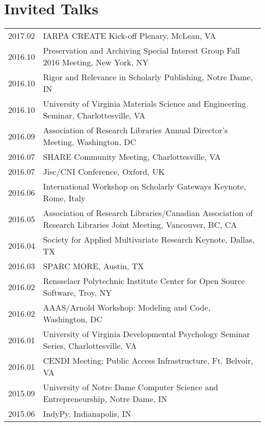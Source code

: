 \documentclass[11pt]{article}
\begin{document}
\section*{Invited Talks}
\begin{tabularx}{\textwidth}{lX}
 	2017.02		& IARPA CREATE Kick-off Plenary, McLean, VA\\
    2016.10     & Preservation and Archiving Special Interest Group Fall 2016 Meeting, New York, NY\\ %
    2016.10     & Rigor and Relevance in Scholarly Publishing, Notre Dame, IN\\ %
    2016.10     & University of Virginia Materials Science and Engineering Seminar, Charlottesville, VA\\ %
    2016.09     & Association of Research Libraries Annual Director's Meeting, Washington, DC\\ %
    2016.07     & SHARE Community Meeting, Charlottesville, VA\\
    2016.07     & Jisc/CNI Conference, Oxford, UK\\
    2016.06     & International Workshop on Scholarly Gateways Keynote, Rome, Italy\\
    2016.05     & Association of Research Libraries/Canadian Association of Research Libraries Joint Meeting, Vancouver, BC, CA\\
    2016.04     & Society for Applied Multivariate Research Keynote, Dallas, TX\\
    2016.03     & SPARC MORE, Austin, TX\\
    2016.02     & Rensselaer Polytechnic Institute Center for Open Source Software, Troy, NY\\
    2016.02     & AAAS/Arnold Workshop: Modeling and Code, Washington, DC\\
    2016.01     & University of Virginia Developmental Psychology Seminar Series, Charlottesville, VA\\
    2016.01     & CENDI Meeting: Public Access Infrastructure, Ft. Belvoir, VA\\
    2015.09     & University of Notre Dame Computer Science and Entrepreneurship, Notre Dame, IN\\
    2015.06     & IndyPy, Indianapolis, IN\\

\end{tabularx}
\end{document}
